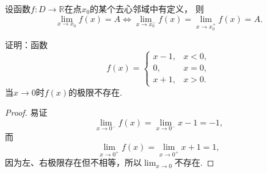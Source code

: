 \begin{theorem}
设函数\(f\colon D\to\mathbb{R}\)在点\(x_0\)的某个去心邻域中有定义，
则\[
	\lim_{x \to x_0} f(x) = A
	\iff
	\lim_{x \to x_0^-} f(x) = \lim_{x \to x_0^+} f(x) = A.
\]
\end{theorem}

\begin{example}
证明：函数\[
	f(x) = \left\{ \begin{array}{lc}
		x-1, & x<0, \\
		0, & x=0, \\
		x+1, & x>0.
	\end{array} \right.
\]当\(x\to0\)时\(f(x)\)的极限不存在.
\begin{proof}
易证\[
	\lim_{x\to0^-} f(x) = \lim_{x\to0^-} x-1 = -1,
\]
而\[
	\lim_{x\to0^+} f(x) = \lim_{x\to0^+} x+1 = 1,
\]
因为左、右极限存在但不相等，所以\(\lim_{x\to0}\)不存在.
\end{proof}
\end{example}
